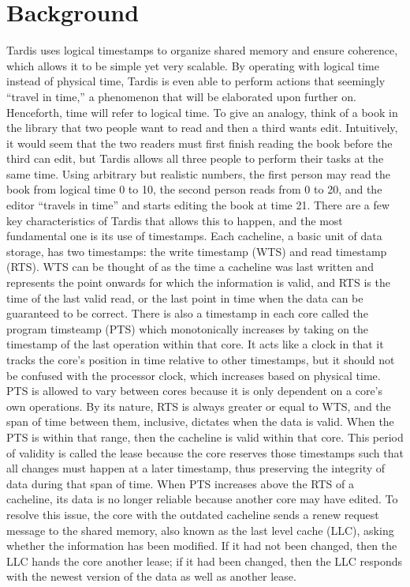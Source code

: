 \documentclass[12pt]{article}
\begin{document}
\section{Background}

Tardis uses logical timestamps to organize shared memory and ensure coherence, which allows it to be simple yet very scalable. By operating with logical time instead of physical time, Tardis is even able to perform actions that seemingly “travel in time,” a phenomenon that will be elaborated upon further on. Henceforth, time will refer to logical time.
To give an analogy, think of a book in the library that two people want to read and then a third wants edit. Intuitively, it would seem that the two readers must first finish reading the book before the third can edit, but Tardis allows all three people to perform their tasks at the same time.  Using arbitrary but realistic numbers, the first person may read the book from logical time 0 to 10, the second person reads from 0 to 20, and the editor “travels in time” and starts editing the book at time 21.
There are a few key characteristics of Tardis that allows this to happen, and the most fundamental one is its use of timestamps. Each cacheline, a basic unit of data storage, has two timestamps: the write timestamp (WTS) and read timestamp (RTS). WTS can be thought of as the time a cacheline was last written and represents the point onwards for which the information is valid, and RTS is the time of the last valid read, or the last point in time when the data can be guaranteed to be correct. There is also a timestamp in each core called the program timsteamp (PTS) which monotonically increases by taking on the timestamp of the last operation within that core. It acts like a clock in that it tracks the core’s position in time relative to other timestamps, but it should not be confused with the processor clock, which increases based on physical time. PTS is allowed to vary between cores because it is only dependent on a core’s own operations.
By its nature, RTS is always greater or equal to WTS, and the span of time between them, inclusive, dictates when the data is valid. When the PTS is within that range, then the cacheline is valid within that core. This period of validity is called the lease because the core reserves those timestamps such that all changes must happen at a later timestamp, thus preserving the integrity of data during that span of time. When PTS increases above the RTS of a cacheline, its data is no longer reliable because another core may have edited. To resolve this issue, the core with the outdated cacheline sends a renew request message to the shared memory, also known as the last level cache (LLC), asking whether the information has been modified. If it had not been changed, then the LLC hands the core another lease; if it had been changed, then the LLC responds with the newest version of the data as well as another lease.
\end{document}
